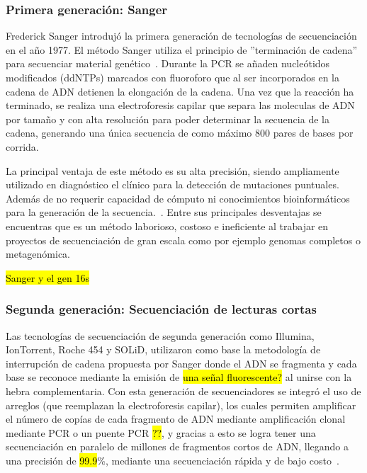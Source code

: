 \subsubsection{Primera generación: Sanger}
Frederick Sanger introdujó la primera generación de tecnologías de secuenciación en el año 1977. El método Sanger utiliza el principio de ''terminación de cadena'' para secuenciar material genético~\cite{sanger1975rapid}. 
Durante la PCR se añaden nucleótidos modificados (ddNTPs) marcados con fluoroforo que al ser incorporados en la cadena de ADN detienen la elongación de la cadena. Una vez que la reacción ha terminado, se realiza una electroforesis capilar que separa las moleculas de ADN por tamaño y con alta resolución para poder determinar la secuencia de la cadena, generando una única secuencia de como máximo 800 pares de bases por corrida.

La principal ventaja de este método es su alta precisión, siendo ampliamente utilizado en diagnóstico el clínico para la detección de mutaciones puntuales. Además de no requerir capacidad de cómputo ni conocimientos bioinformáticos para la generación de la secuencia.~\cite{BUSCAR}.  
Entre sus principales desventajas se encuentras que es un método laborioso, costoso e ineficiente al trabajar en proyectos de secuenciación de gran escala como por ejemplo genomas completos o metagenómica.
 

\hl{Sanger y el gen 16s}

\subsubsection{Segunda generación: Secuenciación de lecturas cortas}
Las tecnologías de secuenciación de segunda generación como Illumina, IonTorrent, Roche 454 y SOLiD,  utilizaron como base la metodología de interrupción de cadena propuesta por Sanger donde el ADN se fragmenta y cada base se reconoce mediante la emisión de \hl{una señal fluorescente?} al unirse con la hebra complementaria. Con esta generación de secuenciadores se integró el uso de arreglos (que reemplazan la electroforesis capilar), los cuales permiten amplificar el número de copías de cada fragmento de ADN mediante amplificación clonal mediante PCR o un puente PCR \hl{??}, y gracias a esto se logra tener una secuenciación en paralelo de millones de fragmentos cortos de ADN, llegando a una precisión de \hl{99.9}\%, mediante una secuenciación rápida y de bajo costo~\cite{buscar}.


